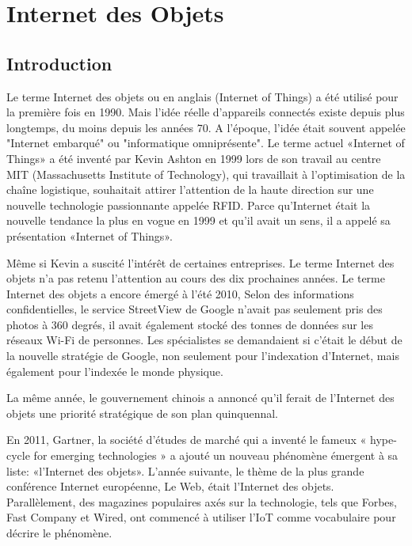 \chapter{Internet des Objets}

\section{Introduction}
Le terme Internet des objets ou en anglais (Internet of Things) a été utilisé pour la première fois en 1990. Mais l’idée réelle d’appareils connectés existe depuis plus longtemps, du moins depuis les années 70. A l'époque, l'idée était souvent appelée "Internet embarqué" ou "informatique omniprésente". Le terme actuel «Internet of Things» a été inventé par Kevin Ashton en 1999 lors de son travail au centre MIT (Massachusetts Institute of Technology), qui travaillait à l’optimisation de la chaîne logistique, souhaitait attirer l’attention de la haute direction sur une nouvelle technologie passionnante appelée RFID. Parce qu’Internet était la nouvelle tendance la plus en vogue en 1999 et qu’il avait un sens, il a appelé sa présentation «Internet of Things».


Même si Kevin a suscité l’intérêt de certaines entreprises. Le terme Internet des objets n'a pas retenu l'attention au cours des dix prochaines années. Le terme Internet des objets a encore émergé à l'été 2010,  Selon des informations confidentielles, le service StreetView de Google n’avait pas seulement pris des photos à 360 degrés, il avait également stocké des tonnes de données sur les réseaux Wi-Fi de personnes. Les spécialistes se demandaient si c'était le début de la nouvelle stratégie de Google, non seulement pour l'indexation d'Internet, mais également pour l'indexée le monde physique.


La même année, le gouvernement chinois a annoncé qu'il ferait de l'Internet des objets une priorité stratégique de son plan quinquennal.


En 2011, Gartner, la société d’études de marché qui a inventé le fameux « hype-cycle for emerging technologies » a ajouté un nouveau phénomène émergent à sa liste: «l’Internet des objets». L’année suivante, le thème de la plus grande conférence Internet européenne, Le Web, était l’Internet des objets. Parallèlement, des magazines populaires axés sur la technologie, tels que Forbes, Fast Company et Wired, ont commencé à utiliser l'IoT comme vocabulaire pour décrire le phénomène.


